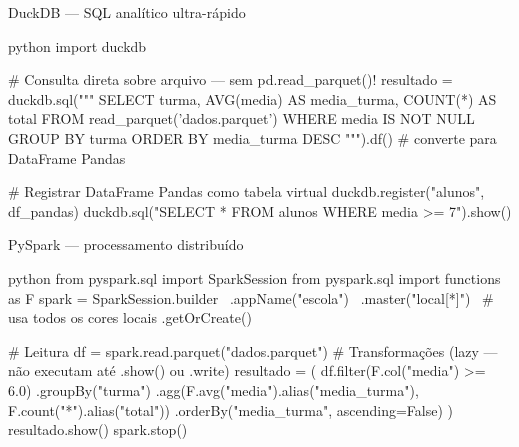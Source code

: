 \documentclass[xcolor=dvipsnames,t,aspectratio=169]{beamer}
\begin{document}
\begin{frame}[c, fragile]{DuckDB — SQL analítico ultra-rápido}

\begin{code}{python}
import duckdb

# Consulta direta sobre arquivo — sem pd.read_parquet()!
resultado = duckdb.sql("""
    SELECT
        turma,
        AVG(media)   AS media_turma,
        COUNT(*)     AS total
    FROM read_parquet('dados.parquet')
    WHERE media IS NOT NULL
    GROUP BY turma
    ORDER BY media_turma DESC
""").df()   # converte para DataFrame Pandas

# Registrar DataFrame Pandas como tabela virtual
duckdb.register("alunos", df_pandas)
duckdb.sql("SELECT * FROM alunos WHERE media >= 7").show()
\end{code}

\end{frame}


\begin{frame}[c, fragile]{PySpark — processamento distribuído}

\begin{code}{python}
from pyspark.sql import SparkSession
from pyspark.sql import functions as F
spark = SparkSession.builder \
    .appName("escola") \
    .master("local[*]") \     # usa todos os cores locais
    .getOrCreate()

# Leitura
df = spark.read.parquet("dados.parquet")
# Transformações (lazy — não executam até .show() ou .write)
resultado = (
    df.filter(F.col("media") >= 6.0)
      .groupBy("turma")
      .agg(F.avg("media").alias("media_turma"),
           F.count("*").alias("total"))
      .orderBy("media_turma", ascending=False)
)
resultado.show()
spark.stop()
\end{code}

\end{frame}




\end{document}
